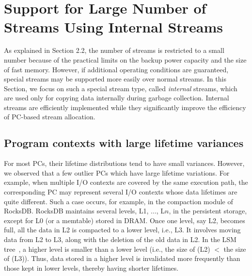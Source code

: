 \section{Support for Large Number of Streams Using Internal Streams}
{\color{blue}
As explained in Section 2.2, the number of streams is restricted to a small number 
because of the practical limits on the backup power capacity and the size of fast memory.  
However, if additional operating conditions are guaranteed, special streams may be 
supported more easily over normal streams.  
In this Section, we focus on such  a special stream type, called {\it internal} streams, which
are used only for copying data internally during garbage collection.  
Internal streams are efficiently implemented while they significantly 
improve the efficiency of PC-based stream allocation.
}

\subsection{Program contexts with large lifetime variances}
For most PCs, their lifetime distributions tend to have small variances.  
However, we observed that a few outlier PCs which have large lifetime variations. 
For example, when multiple I/O contexts are covered by the same execution path, 
the corresponding PC may represent several I/O contexts whose data lifetimes are quite different.   
Such a case occurs, for example, 
in the compaction module of RocksDB.
RocksDB maintains
several levels, L1, ..., L$n$, in the persistent storage, except for L0 (or a
memtable) stored in DRAM.  Once one level, say L2, becomes full, all the data
in L2 is compacted to a lower level, i.e., L3.  It involves moving data from L2
to L3, along with the deletion of the old data in L2.  In the
LSM tree~\cite{LSM}, a higher level is smaller than a lower level 
(i.e., the size of (L2) $<$ the size of (L3)). 
Thus, data stored in a higher level is invalidated more frequently than those kept
in lower levels, thereby having shorter lifetimes.


